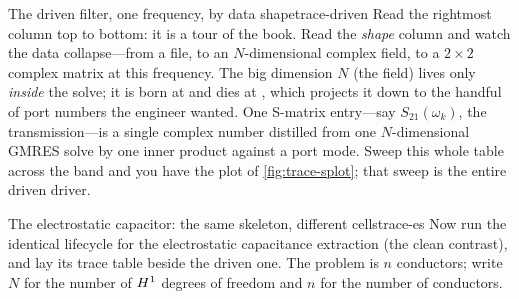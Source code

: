 \begin{workedexample}{The driven filter, one frequency, by data shape}{trace-driven}
\medskip
Read the rightmost column top to bottom: it is a tour of the book. Read the
\emph{shape} column and watch the data collapse---from a file, to an $N$-dimensional
complex field, to a $2\times2$ complex matrix at this frequency. The big dimension
$N$ (the field) lives only \emph{inside} the solve; it is born at 
and dies at , which projects it down to the handful of
port numbers the engineer wanted. One S-matrix entry---say $S_{21}(\omega_k)$, the
transmission---is a single complex number distilled from one $N$-dimensional GMRES
solve by one inner product against a port mode. Sweep this whole table across the
band and you have the plot of \cref{fig:trace-splot}; that sweep is the entire
driven driver.
\end{workedexample}

\begin{workedexample}{The electrostatic capacitor: the same skeleton, different cells}{trace-es}
Now run the identical lifecycle for the electrostatic capacitance extraction (the
clean contrast), and lay its trace table beside the driven one. The problem is $n$
conductors; write $N$ for the number of $H^1$ degrees of freedom and $n$ for the
number of conductors.


\end{workedexample}
